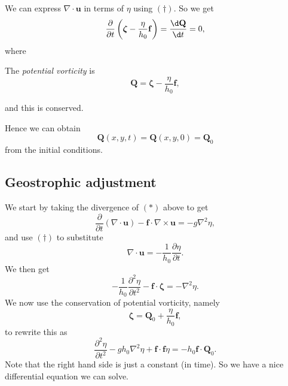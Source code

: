 \documentclass[a4paper]{article}
\begin{document}
We can express $\nabla \cdot \mathbf{u}$ in terms of $\eta$ using $(\dagger)$. So we get
\[
  \frac{\partial}{\partial t}\left(\boldsymbol\zeta - \frac{\eta}{h_0}\mathbf{f}\right) = \frac{\d \mathbf{Q}}{\d t} = 0,
\]
where
\begin{defi}
  The \emph{potential vorticity} is
  \[
    \mathbf{Q} = \boldsymbol\zeta - \frac{\eta}{h_0}\mathbf{f},
  \]
\end{defi}
and this is conserved.

Hence we can obtain
\[
  \mathbf{Q}(x, y, t) = \mathbf{Q}(x, y, 0) = \mathbf{Q}_0
\]
from the initial conditions.

\subsection{Geostrophic adjustment}
We start by taking the divergence of $(*)$ above to get
\[
  \frac{\partial}{\partial t}(\nabla \cdot \mathbf{u}) - \mathbf{f} \cdot \nabla \times \mathbf{u} = - g \nabla^2 \eta,
\]
and use $(\dagger)$ to substitute
\[
  \nabla \cdot \mathbf{u} = -\frac{1}{h_0} \frac{\partial \eta}{\partial t}.
\]
We then get
\[
  -\frac{1}{h_0} \frac{\partial^2 \eta}{\partial t^2} - \mathbf{f}\cdot \boldsymbol\zeta = -\nabla^2 \eta.
\]
We now use the conservation of potential vorticity, namely
\[
  \boldsymbol\zeta = \mathbf{Q}_0 + \frac{\eta}{h_0}\mathbf{f},
\]
to rewrite this as
\[
  \frac{\partial^2 \eta}{\partial t^2} - gh_0 \nabla^2 \eta + \mathbf{f}\cdot \mathbf{f} \eta = - h_0 \mathbf{f}\cdot \mathbf{Q}_0.
\]
Note that the right hand side is just a constant (in time). So we have a nice differential equation we can solve.
\end{document}

